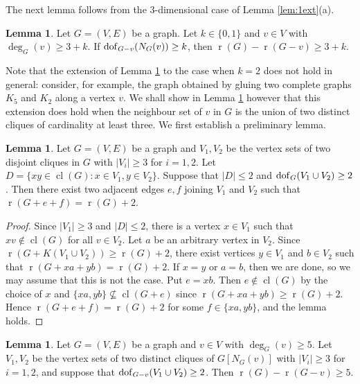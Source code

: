 \documentclass[11pt,a4paper]{article}
\theoremstyle{definition}
\newtheorem{lemma}[theorem]{Lemma}
\DeclareMathOperator{\rr}{r}
\DeclareMathOperator{\cl}{cl}
\newcommand{\dof}{{\rm dof}}
\begin{document}
The next lemma follows  from the 3-dimensional case of 
Lemma \ref{lem:1ext}(a).  

\begin{lemma}\label{lem:01ext:dof}
Let $G=(V,E)$ be a graph.
Let $k\in \{0,1\}$ and $v\in V$ with $\deg_G(v)\geq 3+k$. If $\dof_{G-v}(N_G(v))\geq k$, then
$\rr(G)-\rr(G-v)\geq 3+k$. 
\end{lemma}

Note that the extension of Lemma \ref{lem:01ext:dof} to the case when $k=2$ does not hold in general:
consider, for example, the graph obtained by gluing two complete graphs $K_5$ and $K_2$ along a vertex $v$. We shall show in Lemma \ref{lem:2ext:unified}  however that this extension does hold when the neighbour set of $v$ in $G$ is the union of two distinct cliques of cardinality at least three. We first establish a preliminary lemma.


\begin{lemma}\label{lem:veebridge}
Let $G=(V,E)$ be a graph and $V_1, V_2$ be the vertex sets of two  disjoint cliques in $G$ with 
$|V_i|\geq 3$ for $i=1,2$. Let $D=\{xy\in \cl(G): x\in V_1,y\in V_2\}$. Suppose that $|D|\leq 2$ and 
$\dof_{G}(V_1\cup V_2)\geq 2$.
Then there exist two adjacent edges $e,f$ joining  $V_1$ and $V_2$ such that $\rr(G+e+f)=\rr(G)+2$.
\end{lemma}

\begin{proof}
Since $|V_1|\geq 3$ and $|D|\leq 2$, there is a vertex $x\in V_1$ such that  $xv\not\in \cl(G)$ for all $v\in V_2$. Let $a$ be an arbitrary vertex in $V_2$. Since $\rr(G+K(V_1\cup V_2))\geq \rr(G)+2$, there exist vertices $y\in V_1$ and  $b\in V_2$ such that $\rr(G+xa+yb)= \rr(G)+2$. If $x=y$ or $a=b$, then we are done, so we may assume that this is not the case. Put $e=xb$. Then $e\not\in \cl(G)$ by the choice of $x$ and $\{xa,yb\}\not\subseteq \cl(G+e)$ since $\rr(G+xa+yb)\geq \rr(G)+2$. Hence 
$\rr(G+e+f)=\rr(G)+2$ for some $f\in \{xa,yb\}$, and the lemma holds. 
\end{proof}


\begin{lemma}\label{lem:2ext:unified}
Let $G=(V,E)$ be a graph and $v\in V$ with $\deg_G(v)\geq 5$. 
Let $V_1,V_2$ be the vertex sets of two distinct cliques of $G[N_G(v)]$ with $|V_i|\geq 3$ for $i=1,2$, and suppose that $\dof_{G-v}(V_1\cup V_2)\geq 2$. Then
$\rr(G)-\rr(G-v)\geq 5$.
\end{lemma}
\end{document}

